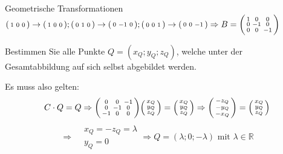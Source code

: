 \begin{example2}{Geometrische Transformationen}
$
\begin{psmallmatrix}
    1 & 0 & 0
\end{psmallmatrix} \rightarrow \begin{psmallmatrix}
    1 & 0 & 0
\end{psmallmatrix} ; \begin{psmallmatrix}
    0 & 1 & 0
\end{psmallmatrix} \rightarrow \begin{psmallmatrix}
    0 & -1 & 0
\end{psmallmatrix} ; \begin{psmallmatrix}
    0 & 0 & 1
\end{psmallmatrix} \rightarrow \begin{psmallmatrix}
    0 & 0 & -1
\end{psmallmatrix} \\ \Rightarrow B=\begin{psmallmatrix}
    1 & 0 & 0 \\
    0 & -1 & 0 \\
    0 & 0 & -1
\end{psmallmatrix}
$

\vspace{2mm}

Bestimmen Sie alle Punkte $Q=\left(x_{Q} ; y_{Q} ; z_{Q}\right)$, welche unter der Gesamtabbildung auf sich selbst abgebildet werden.

Es muss also gelten:
$$
C \cdot Q=Q \Rightarrow \begin{psmallmatrix}
    0 & 0 & -1 \\
    0 & -1 & 0 \\
    -1 & 0 & 0
\end{psmallmatrix}
\begin{psmallmatrix}
    x_{Q} \\
    y_{Q} \\
    z_{Q}
\end{psmallmatrix}=\begin{psmallmatrix}
    x_{Q} \\
    y_{Q} \\
    z_{Q}
\end{psmallmatrix} \Rightarrow \begin{psmallmatrix}
    -z_{Q} \\
    -y_{Q} \\
    -x_{Q}
\end{psmallmatrix}= \begin{psmallmatrix}
    x_{Q} \\
    y_{Q} \\
    z_{Q}
\end{psmallmatrix} 
$$
$$
\Rightarrow \begin{aligned}
    & x_{Q}=-z_{Q}=\lambda \\
    & y_{Q}=0
\end{aligned} \Rightarrow Q=\left(\lambda ; 0 ; -\lambda\right) \text { mit } \lambda \in \mathbb{R}
$$


\end{example2}
